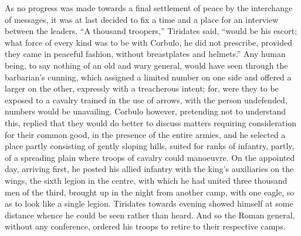 
As no progress was made towards a final settlement of peace by the interchange of messages, it was at last decided to fix a time and a place for an interview between the leaders. ``A thousand troopers,'' Tiridates said, ``would be his escort; what force of every kind was to be with Corbulo, he did not prescribe, provided they came in peaceful fashion, without breastplates and helmets.'' Any human being, to say nothing of an old and wary general, would have seen through the barbarian's cunning, which assigned a limited number on one side and offered a larger on the other, expressly with a treacherous intent; for, were they to be exposed to a cavalry trained in the use of arrows, with the person undefended, numbers would be unavailing. Corbulo however, pretending not to understand this, replied that they would do better to discuss matters requiring consideration for their common good, in the presence of the entire armies, and he selected a place partly consisting of gently sloping hills, suited for ranks of infantry, partly, of a spreading plain where troops of cavalry could manoeuvre. On the appointed day, arriving first, he posted his allied infantry with the king's auxiliaries on the wings, the sixth legion in the centre, with which he had united three thousand men of the third, brought up in the night from another camp, with one eagle, so as to look like a single legion. Tiridates towards evening showed himself at some distance whence he could be seen rather than heard. And so the Roman general, without any conference, ordered his troops to retire to their respective camps.


